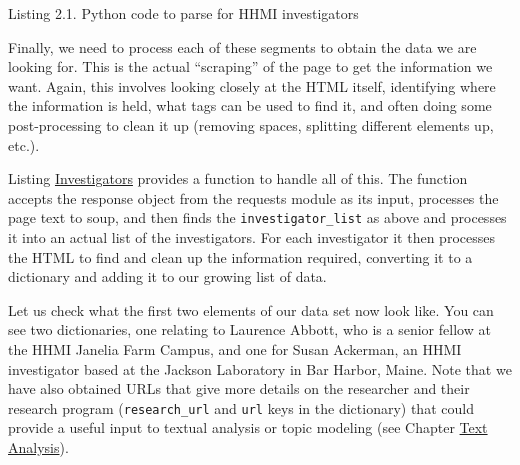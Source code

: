 \documentclass[]{krantz}
\begin{document}
Listing 2.1. Python code to parse for HHMI investigators

Finally, we need to process each of these segments to obtain the data we
are looking for. This is the actual ``scraping'' of the page to get the
information we want. Again, this involves looking closely at the HTML
itself, identifying where the information is held, what tags can be used
to find it, and often doing some post-processing to clean it up
(removing spaces, splitting different elements up, etc.).

Listing \protect\hyperlink{list:web1}{Investigators} provides a function
to handle all of this. The function accepts the response object from the
requests module as its input, processes the page text to soup, and then
finds the \texttt{investigator\_list} as above and processes it into an
actual list of the investigators. For each investigator it then
processes the HTML to find and clean up the information required,
converting it to a dictionary and adding it to our growing list of data.

Let us check what the first two elements of our data set now look like.
You can see two dictionaries, one relating to Laurence Abbott, who is a
senior fellow at the HHMI Janelia Farm Campus, and one for Susan
Ackerman, an HHMI investigator based at the Jackson Laboratory in Bar
Harbor, Maine. Note that we have also obtained URLs that give more
details on the researcher and their research program
(\texttt{research\_url} and \texttt{url} keys in the dictionary) that
could provide a useful input to textual analysis or topic modeling (see
Chapter \protect\hyperlink{chap:text}{Text Analysis}).
\end{document}
